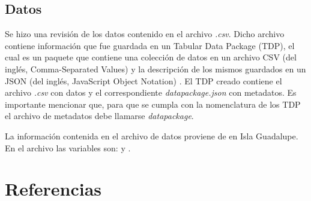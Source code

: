 \documentclass{article}
\begin{document}
\subsection*{Datos} %
Se hizo una revisi\'on de los datos contenido en el archivo
\textit{.csv}. Dicho archivo contiene
informaci\'on que fue guardada en un Tabular Data Package (TDP), el cual es un
paquete que contiene una colecci\'on de datos en un archivo CSV (del ingl\'es,
Comma-Separated Values) y la descripci\'on de los mismos guardados en un JSON
(del ingl\'es, JavaScript Object Notation) \citep{Walsh2012}.
El TDP creado contiene el archivo
\textit{.csv} con datos y el correspondiente
\textit{datapackage.json} con metadatos. Es importante mencionar que, para que
se cumpla con la nomenclatura de los TDP el archivo de metadatos debe llamarse
\textit{datapackage}.

La informaci\'on contenida en el archivo de datos proviene de
 en Isla Guadalupe. En el archivo las
variables son:  y
.


\section*{Referencias}


\end{document}
